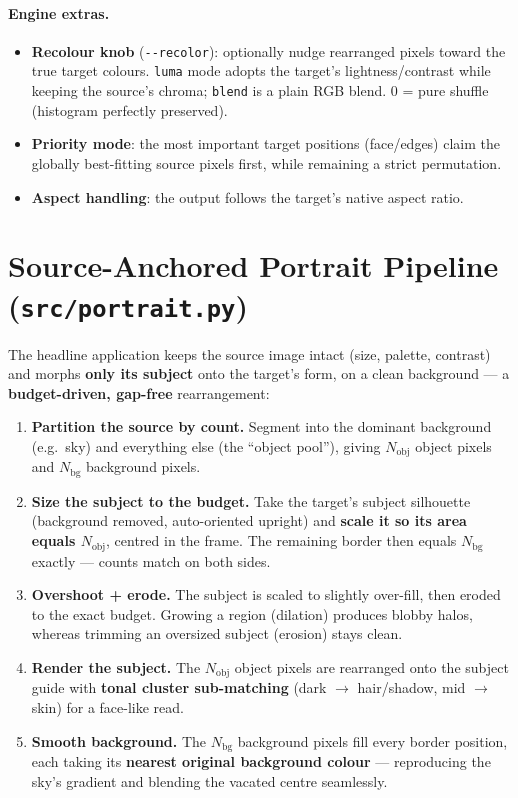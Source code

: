 \documentclass[11pt,a4paper]{article}
\begin{document}
\paragraph{Engine extras.}
\begin{itemize}[leftmargin=1.4em]
  \item \textbf{Recolour knob} (\texttt{-{}-recolor}): optionally nudge rearranged pixels
  toward the true target colours. \texttt{luma} mode adopts the target's lightness/contrast
  while keeping the source's chroma; \texttt{blend} is a plain RGB blend. $0$ = pure shuffle
  (histogram perfectly preserved).
  \item \textbf{Priority mode}: the most important target positions (face/edges) claim the
  globally best-fitting source pixels first, while remaining a strict permutation.
  \item \textbf{Aspect handling}: the output follows the target's native aspect ratio.
\end{itemize}

\section{Source-Anchored Portrait Pipeline (\texttt{src/portrait.py})}
The headline application keeps the source image intact (size, palette, contrast) and morphs
\textbf{only its subject} onto the target's form, on a clean background --- a
\textbf{budget-driven, gap-free} rearrangement:

\begin{enumerate}[leftmargin=1.6em]
  \item \textbf{Partition the source by count.} Segment into the dominant background (e.g.\
  sky) and everything else (the ``object pool''), giving $N_{\text{obj}}$ object pixels and
  $N_{\text{bg}}$ background pixels.
  \item \textbf{Size the subject to the budget.} Take the target's subject silhouette
  (background removed, auto-oriented upright) and \textbf{scale it so its area equals
  $N_{\text{obj}}$}, centred in the frame. The remaining border then equals $N_{\text{bg}}$
  exactly --- counts match on both sides.
  \item \textbf{Overshoot + erode.} The subject is scaled to slightly over-fill, then eroded
  to the exact budget. Growing a region (dilation) produces blobby halos, whereas trimming an
  oversized subject (erosion) stays clean.
  \item \textbf{Render the subject.} The $N_{\text{obj}}$ object pixels are rearranged onto the
  subject guide with \textbf{tonal cluster sub-matching} (dark $\rightarrow$ hair/shadow, mid
  $\rightarrow$ skin) for a face-like read.
  \item \textbf{Smooth background.} The $N_{\text{bg}}$ background pixels fill every border
  position, each taking its \textbf{nearest original background colour} --- reproducing the
  sky's gradient and blending the vacated centre seamlessly.
\end{enumerate}
\end{document}
